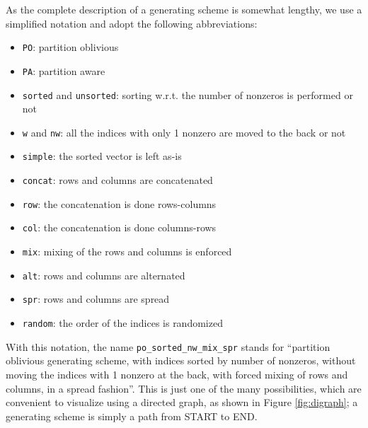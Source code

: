 As the complete description of a generating scheme is somewhat lengthy, we use a simplified notation and adopt the following abbreviations:

\begin{itemize}
	\item \verb|PO|: partition oblivious
	\item \verb|PA|: partition aware
	\item \verb|sorted| and \verb|unsorted|: sorting w.r.t. the number of nonzeros is performed or not
	\item \verb|w| and \verb|nw|: all the indices with only 1 nonzero are moved to the back or not
	\item \verb|simple|: the sorted vector is left as-is
	\item \verb|concat|: rows and columns are concatenated
	\item \verb|row|: the concatenation is done rows-columns
	\item \verb|col|: the concatenation is done columns-rows
	\item \verb|mix|: mixing of the rows and columns is enforced
	\item \verb|alt|: rows and columns are alternated
	\item \verb|spr|: rows and columns are spread
	\item \verb|random|: the order of the indices is randomized
\end{itemize}

With this notation, the name \verb|po_sorted_nw_mix_spr| stands for ``partition oblivious generating scheme, with indices sorted by number of nonzeros, without moving the indices with 1 nonzero at the back, with forced mixing of rows and columns, in a spread fashion''. This is just one of the many possibilities, which are convenient to visualize using a directed graph, as shown in Figure \ref{fig:digraph}; a generating scheme is simply a path from START to END. 

